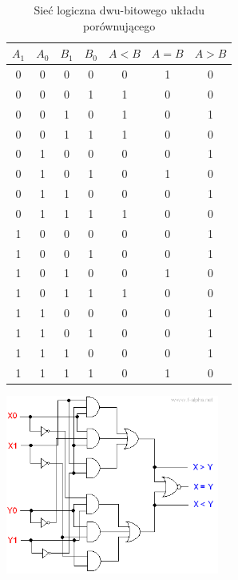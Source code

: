 \documentclass[a4paper,12pt]{article}
\begin{document}
\begin{table}[h!]
\centering

\begin{minipage}{9cm}
\centering

\begin{tabular}{ | c | c | c | c || c | c | c | }
  \hline
  $A_1$ & $A_0$ & $B_1$ & $B_0$ & $A<B$ & $A=B$ & $A>B$ \\ \hline
  0 & 0 & 0 & 0 & 0 & 1 & 0 \\
  0 & 0 & 0 & 1 & 1 & 0 & 0 \\
  0 & 0 & 1 & 0 & 1 & 0 & 1 \\
  0 & 0 & 1 & 1 & 1 & 0 & 0 \\ \hline
  0 & 1 & 0 & 0 & 0 & 0 & 1 \\
  0 & 1 & 0 & 1 & 0 & 1 & 0 \\
  0 & 1 & 1 & 0 & 0 & 0 & 1 \\
  0 & 1 & 1 & 1 & 1 & 0 & 0 \\ \hline
  1 & 0 & 0 & 0 & 0 & 0 & 1 \\
  1 & 0 & 0 & 1 & 0 & 0 & 1 \\
  1 & 0 & 1 & 0 & 0 & 1 & 0 \\
  1 & 0 & 1 & 1 & 1 & 0 & 0 \\ \hline
  1 & 1 & 0 & 0 & 0 & 0 & 1 \\
  1 & 1 & 0 & 1 & 0 & 0 & 1 \\
  1 & 1 & 1 & 0 & 0 & 0 & 1 \\
  1 & 1 & 1 & 1 & 0 & 1 & 0 \\
  \hline
\end{tabular}
\end{minipage}
\begin{minipage}{7.5cm}
   \includegraphics[width=7cm]{grafika/obwody/circuit_diagram_2_bit_magnitude_comparator.png}
   \caption*{Sieć logiczna dwu-bitowego układu porównującego}
\end{minipage}
\end{table}
\end{document}
